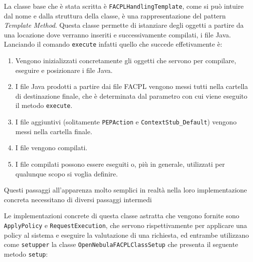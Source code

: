 La classe base che è stata scritta è \texttt{FACPLHandlingTemplate}, come si può intuire dal nome e dalla struttura della classe, è una rappresentazione del pattern \emph{Template Method}\cite{GOF}. Questa classe permette di istanziare degli oggetti a partire da una locazione dove verranno inseriti e successivamente compilati, i file Java. Lanciando il comando \texttt{execute} infatti quello che succede effetivamente è:
\begin{enumerate}
    \item Vengono inizializzati concretamente gli oggetti che servono per compilare, eseguire e posizionare i file Java.
    \item I file Java prodotti a partire dai file FACPL vengono messi tutti nella cartella di destinazione finale, che è determinata dal parametro con cui viene eseguito il metodo \texttt{execute}.
    \item I file aggiuntivi (solitamente \texttt{PEPAction} e \texttt{ContextStub\_Default}) vengono messi nella cartella finale.
    \item I file vengono compilati.
    \item I file compilati possono essere eseguiti o, più in generale, utilizzati per qualunque scopo si voglia definire.
\end{enumerate}
Questi passaggi all'apparenza molto semplici in realtà nella loro implementazione concreta necessitano di diversi passaggi intermedi\par
Le implementazioni concrete di questa classe astratta che vengono fornite sono \texttt{ApplyPolicy} e \texttt{RequestExecution}, che servono rispettivamente per applicare una policy al sistema e eseguire la valutazione di una richiesta, ed entrambe utilizzano come \texttt{setupper} la classe \texttt{OpenNebulaFACPLClassSetup} che presenta il seguente metodo \texttt{setup}:
